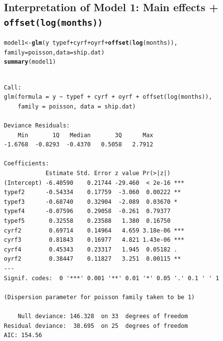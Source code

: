 \documentclass[oneside]{book}\usepackage[]{graphicx}\usepackage[svgnames]{xcolor}
\makeatletter
\newcommand{\hlopt}[1]{\textcolor[rgb]{0,0,0}{#1}}%
\newcommand{\hlstd}[1]{\textcolor[rgb]{0.345,0.345,0.345}{#1}}%
\newcommand{\hlkwb}[1]{\textcolor[rgb]{0.69,0.353,0.396}{#1}}%
\newcommand{\hlkwc}[1]{\textcolor[rgb]{0.333,0.667,0.333}{#1}}%
\newcommand{\hlkwd}[1]{\textcolor[rgb]{0.737,0.353,0.396}{\textbf{#1}}}%
\newenvironment{kframe}{%
 \def\at@end@of@kframe{}%
 \ifinner\ifhmode%
  \def\at@end@of@kframe{\end{minipage}}%
  \begin{minipage}{\columnwidth}%
 \fi\fi%
 \def\FrameCommand##1{\hskip\@totalleftmargin \hskip-\fboxsep
 \colorbox{shadecolor}{##1}\hskip-\fboxsep
     \hskip-\linewidth \hskip-\@totalleftmargin \hskip\columnwidth}%
 \MakeFramed {\advance\hsize-\width
   \@totalleftmargin\z@ \linewidth\hsize
   \@setminipage}}%
 {\par\unskip\endMakeFramed%
 \at@end@of@kframe}
\newenvironment{knitrout}{}{} %
\makeatother
\begin{document}
\subsection*{Interpretation of Model 1: Main effects + \texttt{offset(log(months))}}
\begin{knitrout}
\color{fgcolor}\begin{kframe}
\begin{alltt}
\hlstd{model1} \hlkwb{<-} \hlkwd{glm}\hlstd{(y} \hlopt{~} \hlstd{typef} \hlopt{+} \hlstd{cyrf} \hlopt{+} \hlstd{oyrf} \hlopt{+} \hlkwd{offset}\hlstd{(}\hlkwd{log}\hlstd{(months)),}
  \hlkwc{family} \hlstd{= poisson,} \hlkwc{data} \hlstd{= ship.dat)}
\hlkwd{summary}\hlstd{(model1)}
\end{alltt}
\begin{verbatim}

Call:
glm(formula = y ~ typef + cyrf + oyrf + offset(log(months)), 
    family = poisson, data = ship.dat)

Deviance Residuals: 
    Min       1Q   Median       3Q      Max  
-1.6768  -0.8293  -0.4370   0.5058   2.7912  

Coefficients:
            Estimate Std. Error z value Pr(>|z|)    
(Intercept) -6.40590    0.21744 -29.460  < 2e-16 ***
typef2      -0.54334    0.17759  -3.060  0.00222 ** 
typef3      -0.68740    0.32904  -2.089  0.03670 *  
typef4      -0.07596    0.29058  -0.261  0.79377    
typef5       0.32558    0.23588   1.380  0.16750    
cyrf2        0.69714    0.14964   4.659 3.18e-06 ***
cyrf3        0.81843    0.16977   4.821 1.43e-06 ***
cyrf4        0.45343    0.23317   1.945  0.05182 .  
oyrf2        0.38447    0.11827   3.251  0.00115 ** 
---
Signif. codes:  0 '***' 0.001 '**' 0.01 '*' 0.05 '.' 0.1 ' ' 1

(Dispersion parameter for poisson family taken to be 1)

    Null deviance: 146.328  on 33  degrees of freedom
Residual deviance:  38.695  on 25  degrees of freedom
AIC: 154.56


\end{verbatim}
\end{kframe}
\end{knitrout}
\end{document}
